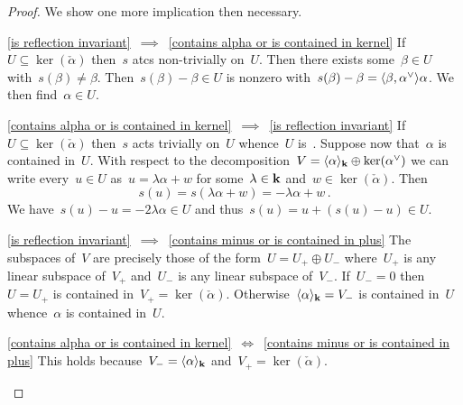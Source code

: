 \begin{proof}
  We show one more implication then necessary.
  \begin{implicationlist}
    \item[\ref*{is reflection invariant}~$\implies$~\ref*{contains alpha or is contained in kernel}]
      If~$U \subseteq \ker(\check{\alpha})$ then~$s$ atcs non-trivially on~$U$.
      Then there exists some~$\beta \in U$ with~$s(\beta) \neq \beta$.
      Then~$s(\beta) - \beta \in U$ is nonzero with~$s(\beta) - \beta = \pair{\beta, \check{\alpha}} \alpha$.
      We then find~$\alpha \in U$.
    \item[\ref*{contains alpha or is contained in kernel}~$\implies$~\ref*{is reflection invariant}]
      If~$U \subseteq \ker(\check{\alpha})$ then~$s$ acts trivially on~$U$ whence~$U$ is~{}.
      Suppose now that~$\alpha$ is contained in~$U$.
      With respect to the decomposition~$V = \gen{\alpha}_{\kf} \oplus \ker(\check{\alpha})$ we can write every~$u \in U$ as~$u = \lambda \alpha + w$ for some~$\lambda \in \mathbf{k}$ and~$w \in \ker(\check{\alpha})$.
      Then
      \[
        s(u)
        =
        s(\lambda \alpha + w)
        =
        -\lambda \alpha + w \,.
      \]
      We have~$s(u) - u = -2 \lambda \alpha \in U$ and thus~$s(u) = u + (s(u)-u) \in U$.
    \item[\ref*{is reflection invariant}~$\implies$~\ref*{contains minus or is contained in plus}]
      The~{} subspaces of~$V$ are precisely those of the form~$U = U_+ \oplus U_-$ where~$U_+$ is any linear subspace of~$V_+$ and~$U_-$ is any linear subspace of~$V_-$.
      If~$U_- = 0$ then~$U = U_+$ is contained in~$V_+ = \ker(\check{\alpha})$.
      Otherwise~$\langle\alpha\rangle_{\mathbf{k}} = V_-$ is contained in~$U$ whence~$\alpha$ is contained in~$U$.
    \item[\ref*{contains alpha or is contained in kernel}~$\iff$~\ref*{contains minus or is contained in plus}]
      This holds because~$V_- = \langle\alpha\rangle_{\mathbf{k}}$ and~$V_+ = \ker(\check{\alpha})$.
    \qedhere
  \end{implicationlist}
\end{proof}


